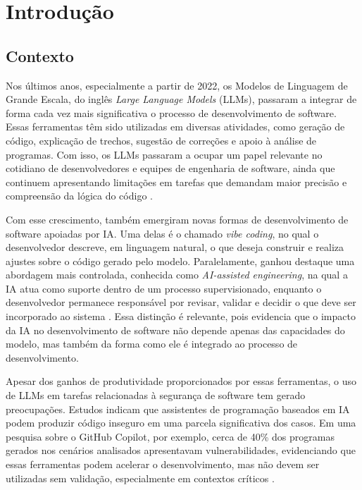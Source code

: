 \chapter[Introdução]{Introdução}

\section{Contexto}
Nos últimos anos, especialmente a partir de 2022, os Modelos de Linguagem de Grande Escala, do inglês \textit{Large Language Models} (LLMs), passaram a integrar de forma cada vez mais significativa o processo de desenvolvimento de software. Essas ferramentas têm sido utilizadas em diversas atividades, como geração de código, explicação de trechos, sugestão de correções e apoio à análise de programas. Com isso, os LLMs passaram a ocupar um papel relevante no cotidiano de desenvolvedores e equipes de engenharia de software, ainda que continuem apresentando limitações em tarefas que demandam maior precisão e compreensão da lógica do código \cite{zhou_large_2024}.

Com esse crescimento, também emergiram novas formas de desenvolvimento de software apoiadas por IA. Uma delas é o chamado \textit{vibe coding}, no qual o desenvolvedor descreve, em linguagem natural, o que deseja construir e realiza ajustes sobre o código gerado pelo modelo. Paralelamente, ganhou destaque uma abordagem mais controlada, conhecida como \textit{AI-assisted engineering}, na qual a IA atua como suporte dentro de um processo supervisionado, enquanto o desenvolvedor permanece responsável por revisar, validar e decidir o que deve ser incorporado ao sistema \cite{osmani_vibe_2025}. Essa distinção é relevante, pois evidencia que o impacto da IA no desenvolvimento de software não depende apenas das capacidades do modelo, mas também da forma como ele é integrado ao processo de desenvolvimento.

Apesar dos ganhos de produtividade proporcionados por essas ferramentas, o uso de LLMs em tarefas relacionadas à segurança de software tem gerado preocupações. Estudos indicam que assistentes de programação baseados em IA podem produzir código inseguro em uma parcela significativa dos casos. Em uma pesquisa sobre o GitHub Copilot, por exemplo, cerca de 40\% dos programas gerados nos cenários analisados apresentavam vulnerabilidades, evidenciando que essas ferramentas podem acelerar o desenvolvimento, mas não devem ser utilizadas sem validação, especialmente em contextos críticos \cite{pearce_asleep_2021}.

